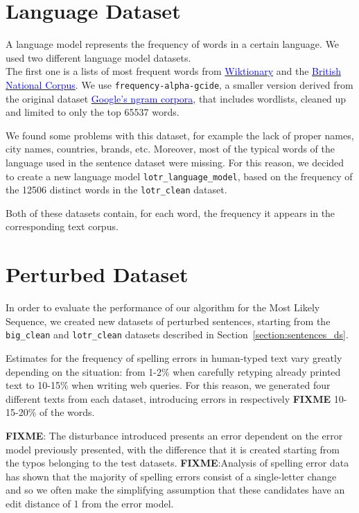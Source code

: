 \section{Language Dataset}
A language model represents the frequency of words in a certain language.
We used two different language model datasets. \\
The first one is a lists of most frequent words from 
\href{https://en.wiktionary.org/wiki/Wiktionary:Frequency_lists}{\textcolor{blue}{Wiktionary}} and the 
	\href{http://www.kilgarriff.co.uk/bnc-readme.html}{\textcolor{blue}{British National Corpus}}. 
We use \texttt{frequency-alpha-gcide}, a smaller version derived from the original dataset 
\href{https://books.google.com/ngrams/}{\textcolor{blue}{Google's ngram corpora}}, that includes wordlists, 
cleaned up and limited to only the top \num{65537} words.

We found some problems with this dataset, for example the lack of proper names, city names, countries, brands, 
etc. Moreover, most of the typical words of the language used in the sentence dataset were missing.
For this reason, we decided to create a new language model \texttt{lotr\_language\_model}, based on the 
frequency of the \num{12506} distinct words in the \texttt{lotr\_clean} dataset.

Both of these datasets contain, for each word, the frequency it appears in the corresponding text corpus.

\section{Perturbed Dataset}
\label{section:perturbed}
In order to evaluate the performance of our algorithm for the Most Likely Sequence, we created new datasets of 
perturbed sentences, starting from the \texttt{big\_clean} and \texttt{lotr\_clean} datasets described in 
Section~\ref{section:sentences_ds}.

Estimates for the frequency of spelling errors in human-typed text vary greatly depending on the situation: from 1-2\% 
when carefully retyping already printed text to 10-15\% when writing web queries. For this reason, we generated four 
different texts from each dataset, introducing errors in respectively \textbf{FIXME} \num{10}-\num{15}-\num{20}\% of 
the words.

\textbf{FIXME}:
The disturbance introduced presents an error dependent on the error model previously presented, with the 
difference that it is created starting from the typos belonging to the test datasets.
\textbf{FIXME}:{Analysis of spelling error data has shown that the majority of spelling errors consist of a 
single-letter change and so we often make the simplifying assumption that these candidates have an edit 
distance of 1 from the error model.}

